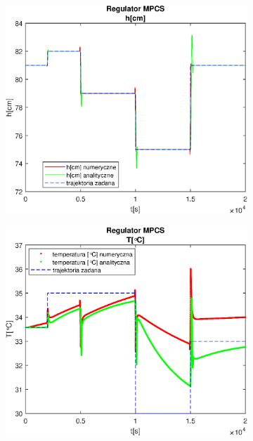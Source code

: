 \begin{figure}[h!]
   \centering
   \begin{subfigure}[b]{0.4\textwidth}
      \includegraphics[width=1\linewidth]{img/MPCSnumRK/MPCSRKHN80Nu30l30.eps}
      \caption{}
      \label{fig:fig:MPCSRKN80Nu30l301}
   \end{subfigure}
       
   \begin{subfigure}[b]{0.4\textwidth}
      \includegraphics[width=1\linewidth]{img/MPCSnumRK/MPCSRKTN80Nu30l30.eps}
      \caption{}
      \label{fig:fig:MPCSRKN80Nu30l302}
   \end{subfigure}
       

\end{figure}
